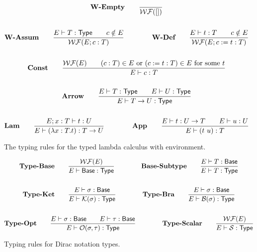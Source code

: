 \documentclass{article}
\begin{document}
\begin{figure}[h]
    \begin{gather*}
        \textbf{W-Empty} \qquad
        \frac{}{\mathcal{WF}([])}\\
        \\
        \textbf{W-Assum} \qquad
        \frac{E\vdash T:\mathsf{Type} \qquad c \notin E}{\mathcal{WF}(E; c:T)}
        \qquad \qquad
        \textbf{W-Def} \qquad
        \frac{E\vdash t:T \qquad c \notin E}{\mathcal{WF}(E; c:=t:T)} \\
        \\
        \textbf{Const} \qquad
        \frac{\mathcal{WF}(E) \qquad (c:T) \in E \text{ or } (c := t : T) \in E \text{ for some $t$}}{E \vdash c : T} \\
        \\
        \textbf{Arrow} \qquad
        \frac{E \vdash T:\mathsf{Type} \qquad E \vdash U:\mathsf{Type}}{E \vdash T \to U : \mathsf{Type}} \\
        \\
        \textbf{Lam} \qquad
        \frac{E;x:T \vdash t : U}{E \vdash (\lambda x:T . t) : T \to U}
        \qquad \qquad
        \textbf{App} \qquad
        \frac{E \vdash t:U \to T \qquad E \vdash u:U}{E \vdash (t\ u):T}
    \end{gather*}
    \caption{The typing rules for the typed lambda calculus with environment.}
\end{figure}

\begin{figure}[h]
    \begin{gather*}
        \textbf{Type-Base} \qquad
        \frac{\mathcal{WF}(E)}{E \vdash \mathsf{Base} : \mathsf{Type}} 
        \qquad \qquad
        \textbf{Base-Subtype} \qquad
        \frac{E \vdash T : \mathsf{Base}}{E \vdash T : \mathsf{Type}} \\
        \\
        \textbf{Type-Ket} \qquad
        \frac{E \vdash \sigma : \mathsf{Base}}{E \vdash \mathcal{K}(\sigma) : \mathsf{Type}}
        \qquad \qquad
        \textbf{Type-Bra} \qquad
        \frac{E \vdash \sigma : \mathsf{Base}}{E \vdash \mathcal{B}(\sigma) : \mathsf{Type}} \\
        \\
        \textbf{Type-Opt} \qquad
        \frac{E \vdash \sigma : \mathsf{Base} \qquad E \vdash \tau : \mathsf{Base}}{E \vdash \mathcal{O}(\sigma, \tau) : \mathsf{Type}}
        \qquad \qquad
        \textbf{Type-Scalar} \qquad
        \frac{\mathcal{WF}(E)}{E \vdash \mathcal{S} : \mathsf{Type}}
    \end{gather*}
    \caption{Typing rules for Dirac notation types.}
\end{figure}
\end{document}

